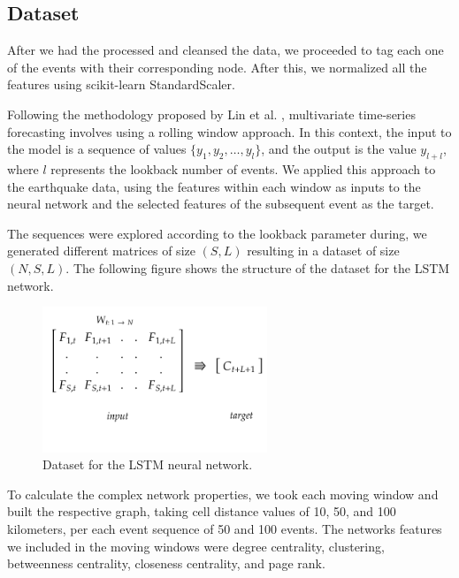 \documentclass[sn-mathphys-num]{sn-jnl}
\begin{document}
\subsection{Dataset}\label{dataset}

After we had the processed and cleansed the data,  we proceeded to tag each one of the events with their corresponding node. After this, we normalized all the features using scikit-learn StandardScaler.

Following the methodology proposed by Lin et al. \cite{lai_modeling_2018}, multivariate time-series forecasting involves using a rolling window approach. In this context, the input to the model is a sequence of values \( \{y_1, y_2, \ldots, y_l\} \), and the output is the value \( y_{l+l} \), where \( l \) represents the lookback number of events. We applied this approach to the earthquake data, using the features within each window as inputs to the neural network and the selected features of the subsequent event as the target.

The sequences were explored according to the lookback parameter during, we generated different matrices of size \( (S, L) \) resulting in a dataset of size \( (N, S, L)\). The following figure shows the structure of the dataset for the LSTM network.

\begin{figure}[H]
    \centering
    \includegraphics[width=0.6\textwidth]{img/dataset-diagram.png}
    \caption{Dataset for the LSTM neural network.\label{fig2}}
\end{figure}
\unskip


To calculate the complex network properties, we took each moving window and built the respective graph, taking cell distance values of 10, 50, and 100 kilometers, per each event sequence of 50 and 100 events.
The networks features we included in the moving windows were degree centrality, clustering, betweenness centrality, closeness centrality, and page rank. 

\end{document}

